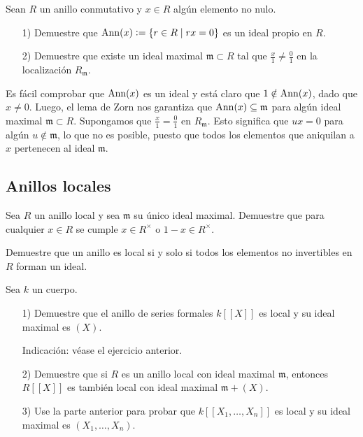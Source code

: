 \begin{ejercicio}
  Sean $R$ un anillo conmutativo y $x \in R$ algún elemento no nulo.

  \begin{enumerate}
  \item[1)] Demuestre que $\operatorname{Ann} (x) \mathrel{\mathop:}= \{ r \in R \mid rx = 0 \}$ es un ideal
    propio en $R$.

  \item[2)] Demuestre que existe un ideal maximal $\mathfrak{m} \subset R$ tal
    que $\frac{x}{1} \ne \frac{0}{1}$ en la localización $R_\mathfrak{m}$.
  \end{enumerate}

  \ifdefined\solutions
  \begin{solucion}
    Es fácil comprobar que $\operatorname{Ann} (x)$ es un ideal y está claro que
    $1 \notin \operatorname{Ann} (x)$, dado que $x \ne 0$. Luego, el lema de Zorn nos
    garantiza que $\operatorname{Ann} (x) \subseteq \mathfrak{m}$ para algún ideal maximal
    $\mathfrak{m} \subset R$. Supongamos que $\frac{x}{1} = \frac{0}{1}$ en
    $R_\mathfrak{m}$. Esto significa que $ux = 0$ para algún
    $u \notin \mathfrak{m}$, lo que no es posible, puesto que todos los
    elementos que aniquilan a $x$ pertenecen al ideal $\mathfrak{m}$.
  \end{solucion}
  \fi
\end{ejercicio}

\subsection*{Anillos locales}

\begin{ejercicio}
  Sea $R$ un anillo local y sea $\mathfrak{m}$ su único ideal maximal. Demuestre
  que para cualquier $x\in R$ se cumple $x\in R^\times$ o $1-x\in R^\times$.
\end{ejercicio}

\begin{ejercicio}
  Demuestre que un anillo es local si y solo si todos los elementos no
  invertibles en $R$ forman un ideal.
\end{ejercicio}

\begin{ejercicio}
  Sea $k$ un cuerpo.

  \begin{enumerate}
  \item[1)] Demuestre que el anillo de series formales $k [\![X]\!]$ es local y
    su ideal maximal es $(X)$.

    \noindent Indicación: véase el ejercicio anterior.

  \item[2)] Demuestre que si $R$ es un anillo local con ideal maximal
    $\mathfrak{m}$, entonces $R [\![X]\!]$ es también local con ideal maximal
    $\mathfrak{m} + (X)$.

  \item[3)] Use la parte anterior para probar que $k [\![X_1,\ldots,X_n]\!]$ es
    local y su ideal maximal es $(X_1,\ldots,X_n)$.
  \end{enumerate}
\end{ejercicio}

